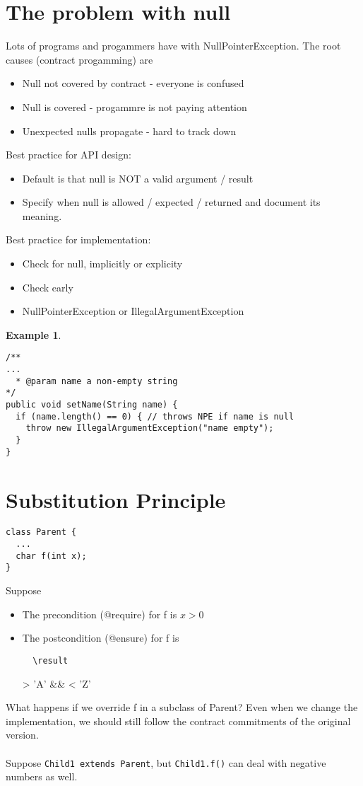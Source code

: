 \documentclass{article}
\theoremstyle{remark}
\theoremstyle{definition}
\newtheorem{example}{Example}
\begin{document}
\section*{The problem with null}
Lots of programs and progammers have with NullPointerException.
The root causes (contract progamming) are
\begin{itemize}
  \item Null not covered by contract - everyone is confused
  \item Null is covered - progammre is not paying attention
  \item Unexpected nulls propagate - hard to track down
\end{itemize}
Best practice for API design:
\begin{itemize}
  \item Default is that null is NOT a valid argument / result
  \item Specify when null is allowed / expected / returned and document its
    meaning.
\end{itemize}
Best practice for implementation:
\begin{itemize}
  \item Check for null, implicitly or explicity
  \item Check early
  \item NullPointerException or IllegalArgumentException
\end{itemize}
\begin{example}
\begin{lstlisting}
/**
...
  * @param name a non-empty string
*/
public void setName(String name) {
  if (name.length() == 0) { // throws NPE if name is null
    throw new IllegalArgumentException("name empty");
  }
}
\end{lstlisting}
\end{example}

\section*{Substitution Principle}
\begin{lstlisting}
class Parent {
  ...
  char f(int x);
}
\end{lstlisting}
Suppose \begin{itemize}
  \item The precondition (@require) for f is $ x > 0 $
  \item The postcondition (@ensure) for f is \begin{lstlisting}
  \result
  \end{lstlisting}\result > 'A' \&\&
    \result < 'Z'
\end{itemize}
What happens if we override f in a subclass of Parent? Even when
we change the implementation, we should still follow the contract
commitments of the original version.
\\\\
Suppose \lstinline{Child1 extends Parent}, but \lstinline{Child1.f()} can deal
with negative numbers as well.
\end{document}
